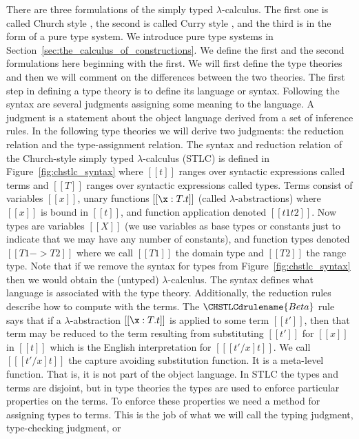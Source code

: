 There are three formulations of the simply typed $\lambda$-calculus.
The first one is called Church style
\cite{Girard:1989,Barendregt:1992,Church:1940}, the second is called
Curry style \cite{Barendregt:1992,Reynolds:1998}, and the third is in
the form of a pure type system.  We introduce pure type systems in
Section~\ref{sec:the_calculus_of_constructions}.  We define the first
and the second formulations here beginning with the first.  We will
first define the type theories and then we will comment on the
differences between the two theories.  The first step in defining a
type theory is to define its language or syntax.  Following the syntax
are several judgments assigning some meaning to the language.  A
judgment is a statement about the object language derived from a set
of inference rules.  In the following type theories we will derive two
judgments: the reduction relation and the type-assignment relation.
The syntax and reduction relation of the Church-style simply typed
$\lambda$-calculus (STLC) is defined in Figure~\ref{fig:chstlc_syntax}
where $[[t]]$ ranges over syntactic expressions called terms and
$[[T]]$ ranges over syntactic expressions called types. Terms consist
of variables $[[x]]$, unary functions $[[\x:T.t]]$ (called
$\lambda$-abstractions) where $[[x]]$ is bound in $[[t]]$, and
function application denoted $[[t1 t2]]$.  Now types are variables
$[[X]]$ (we use variables as base types or constants just to indicate
that we may have any number of constants), and function types denoted
$[[T1 -> T2]]$ where we call $[[T1]]$ the domain type and $[[T2]]$ the
range type.  Note that if we remove the syntax for types from
Figure~\ref{fig:chstlc_syntax} then we would obtain the (untyped)
$\lambda$-calculus.  The syntax defines what language is associated
with the type theory.  Additionally, the reduction rules describe how
to compute with the terms.  The $\CHSTLCdrulename{Beta}$ rule says
that if a $\lambda$-abstraction $[[\x:T.t]]$ is applied to some term
$[[t']]$, then that term may be reduced to the term resulting from
substituting $[[t']]$ for $[[x]]$ in $[[t]]$ which is the English
interpretation for $[[ [t'/x]t]]$. We call $[[ [t'/x] t]]$ the capture
avoiding substitution function. It is a meta-level function. That is,
it is not part of the object language. In STLC the types and terms are
disjoint, but in type theories the types are used to enforce
particular properties on the terms.  To enforce these properties we
need a method for assigning types to terms.  This is the job of what
we will call the typing judgment, type-checking judgment, or
